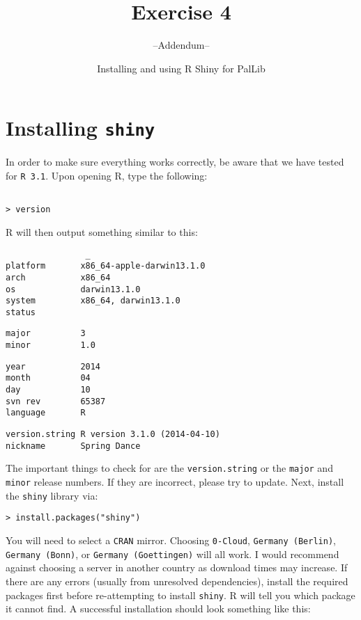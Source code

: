 \documentclass[a4paper,12pt]{article}
\title{Exercise 4}
\author{--Addendum--}
\date{Installing and using R Shiny for PalLib}
\begin{document}
\maketitle
\thispagestyle{fancy}
\section*{Installing \texttt{shiny}}
In order to make sure everything works correctly, be aware that we have tested for \texttt{R 3.1}. Upon opening R, type the following:

\begin{verbatim}
    
> version

\end{verbatim}
R will then output something similar to this:
\begin{verbatim}
                _                           
platform       x86_64-apple-darwin13.1.0   
arch           x86_64                      
os             darwin13.1.0                
system         x86_64, darwin13.1.0        
status
\end{verbatim}
\begin{Verbatim}[formatcom=\color{OliveGreen}]                                     
major          3                           
minor          1.0                         
\end{Verbatim}
\begin{verbatim}
year           2014                        
month          04                          
day            10                          
svn rev        65387                       
language       R
\end{verbatim}
\begin{Verbatim}[formatcom=\color{OliveGreen}]                            
version.string R version 3.1.0 (2014-04-10)
nickname       Spring Dance
\end{Verbatim}

The important things to check for are the \textcolor{OliveGreen}{\texttt{version.string}} or the \textcolor{OliveGreen}{\texttt{major}} and \textcolor{OliveGreen}{\texttt{minor}} release numbers. If they are incorrect, please try to update. Next, install the \texttt{shiny} library via:
\begin{verbatim}
> install.packages("shiny")
\end{verbatim}
You will need to select a \texttt{CRAN} mirror. Choosing \texttt{0-Cloud}, \texttt{Germany (Berlin)}, \texttt{Germany (Bonn)}, or \texttt{Germany (Goettingen)} will all work. I would recommend against choosing a server in another country as download times may increase. If there are any errors (usually from unresolved dependencies), install the required packages first before re-attempting to install \texttt{shiny}. R will tell you which package it cannot find. A successful installation should look something like this:
\end{document}
